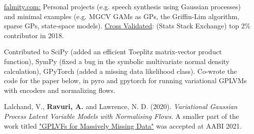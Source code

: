 

\begin{cvskills}

  {\href{https://www.falmity.com}{falmity.com:} Personal projects (e.g. speech synthesis using Gaussian processes) and minimal examples (e.g. MGCV GAMs as GPs, the Griffin-Lim algorithm, sparse GPs, state-space models). \href{https://stats.stackexchange.com/users/211930/infprobscix}{Cross Validated}: (Stats Stack Exchange) top 2\% contributor in 2018.}

  {Contributed to SciPy (added an efficient Toeplitz matrix-vector product function), SymPy (fixed a bug in the symbolic multivariate normal density calculation), GPyTorch (added a missing data likelihood class). Co-wrote the code for the paper below, in pyro and gpytorch for running variational GPLVMs with encoders and normalizing flows.}

  {\item Lalchand, V., \textbf{Ravuri, A.} and Lawrence, N. D. (2020). \textit{Variational Gaussian Process Latent Variable Models with Normalising Flows}. A smaller part of the work titled \href{https://openreview.net/pdf?id=zaMwvOjsyym}{"GPLVFs for Massively Missing Data"} was accepted at AABI 2021.}


\end{cvskills}




